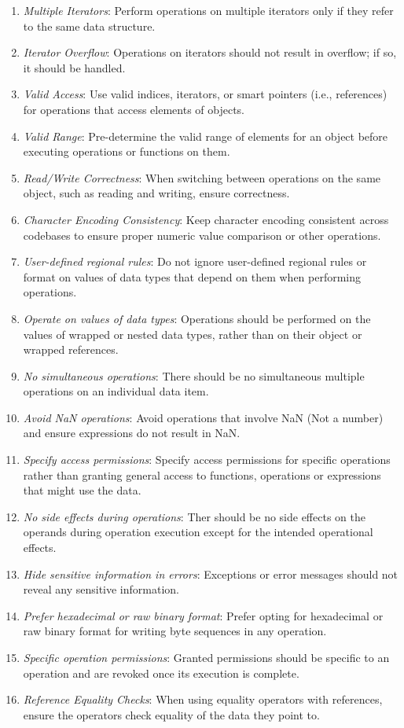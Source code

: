 \documentclass[9pt]{IEEEtran} %
\begin{document}
\begin{enumerate}
  \item \textit{Multiple Iterators}: Perform operations on multiple iterators only if they refer to the same data structure.
  \item \textit{Iterator Overflow}: Operations on iterators should not result in overflow; if so, it should be handled.
  \item \textit{Valid Access}: Use valid indices, iterators, or smart pointers (i.e., references) for operations that access elements of objects.
  \item \textit{Valid Range}: Pre-determine the valid range of elements for an object before executing operations or functions on them.
  \item \textit{Read/Write Correctness}: When switching between operations on the same object, such as reading and writing, ensure correctness.
  \item \textit{Character Encoding Consistency}: Keep character encoding consistent across codebases to ensure proper numeric value comparison or other operations.
  \item \textit{User-defined regional rules}: Do not ignore user-defined regional rules or format on values of data types that depend on them when performing operations.
  \item \textit{Operate on values of data types}: Operations should be performed on the values of wrapped or nested data types, rather than on their object or wrapped references.
  \item \textit{No simultaneous operations}: There should be no simultaneous multiple operations on an individual data item.
  \item \textit{Avoid NaN operations}: Avoid operations that involve NaN (Not a number) and ensure expressions do not result in NaN.
  \item \textit{Specify access permissions}: Specify access permissions for specific operations rather than granting general access to functions, operations or expressions that might use the data.
  \item \textit{No side effects during operations}: Ther should be no side effects on the operands during operation execution except for the intended operational effects.
  \item \textit{Hide sensitive information in errors}: Exceptions or error messages should not reveal any sensitive information.
  \item \textit{Prefer hexadecimal or raw binary format}: Prefer opting for hexadecimal or raw binary format for writing byte sequences in any operation.
  \item \textit{Specific operation permissions}: Granted permissions should be specific to an operation and are revoked once its execution is complete.
  \item \textit{Reference Equality Checks}: When using equality operators with references, ensure the operators check equality of the data they point to.
\end{enumerate}
\end{document}
